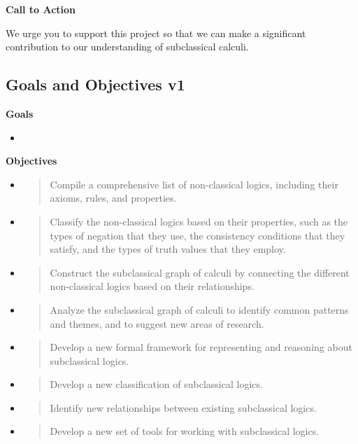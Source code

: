 \textbf{Call to Action}

We urge you to support this project so that we can make a significant
contribution to our understanding of subclassical calculi.

\hypertarget{goals-and-objectives-v1}{%
\subsection{Goals and Objectives v1}\label{goals-and-objectives-v1}}

\textbf{Goals}

\begin{itemize}
\tightlist
\item
\end{itemize}

\textbf{Objectives}

\begin{itemize}
\item
  \begin{quote}
  Compile a comprehensive list of non-classical logics, including their
  axioms, rules, and properties.
  \end{quote}
\item
  \begin{quote}
  Classify the non-classical logics based on their properties, such as
  the types of negation that they use, the consistency conditions that
  they satisfy, and the types of truth values that they employ.
  \end{quote}
\item
  \begin{quote}
  Construct the subclassical graph of calculi by connecting the
  different non-classical logics based on their relationships.
  \end{quote}
\item
  \begin{quote}
  Analyze the subclassical graph of calculi to identify common patterns
  and themes, and to suggest new areas of research.
  \end{quote}
\item
  \begin{quote}
  Develop a new formal framework for representing and reasoning about
  subclassical logics.
  \end{quote}
\item
  \begin{quote}
  Develop a new classification of subclassical logics.
  \end{quote}
\item
  \begin{quote}
  Identify new relationships between existing subclassical logics.
  \end{quote}
\item
  \begin{quote}
  Develop a new set of tools for working with subclassical logics.
  \end{quote}
\end{itemize}

